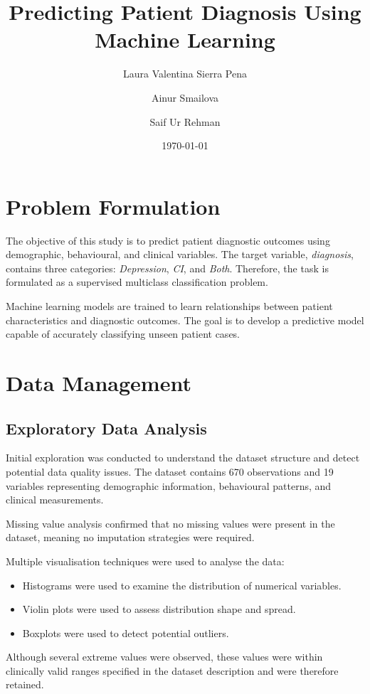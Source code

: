 \documentclass[11pt]{article}
\title{Predicting Patient Diagnosis Using Machine Learning}
\author{Laura Valentina Sierra Pena\and Ainur Smailova \and Saif Ur Rehman}
\date{\today}
\begin{document}
\maketitle

\section{Problem Formulation}

The objective of this study is to predict patient diagnostic outcomes using demographic, behavioural, and clinical variables. The target variable, \textit{diagnosis}, contains three categories: \textit{Depression}, \textit{CI}, and \textit{Both}. Therefore, the task is formulated as a supervised multiclass classification problem.

Machine learning models are trained to learn relationships between patient characteristics and diagnostic outcomes. The goal is to develop a predictive model capable of accurately classifying unseen patient cases.

\section{Data Management}

\subsection{Exploratory Data Analysis}

Initial exploration was conducted to understand the dataset structure and detect potential data quality issues. The dataset contains 670 observations and 19 variables representing demographic information, behavioural patterns, and clinical measurements.

Missing value analysis confirmed that no missing values were present in the dataset, meaning no imputation strategies were required.

Multiple visualisation techniques were used to analyse the data:

\begin{itemize}
\item Histograms were used to examine the distribution of numerical variables.
\item Violin plots were used to assess distribution shape and spread.
\item Boxplots were used to detect potential outliers.
\end{itemize}

Although several extreme values were observed, these values were within clinically valid ranges specified in the dataset description and were therefore retained.
\end{document}
